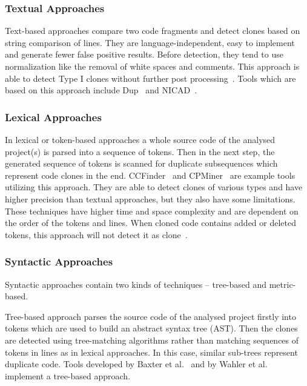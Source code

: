       \subsubsection*{Textual Approaches}\label{clone-detection:simian}
      Text-based approaches compare two code fragments and detect clones based on string comparison of lines.
      They are language-independent, easy to implement and generate fewer false positive results. Before detection,
      they tend to use normalization like the removal of white spaces and comments. This approach is able to detect
      Type I clones without further post processing~\cite{CloneDetectionTechniques, CodeClonesSurvey}. Tools which
      are based on this approach include Dup~\cite{Dup} and NICAD~\cite{NICAD}.

      \subsubsection*{Lexical Approaches}
      In lexical or token-based approaches a whole source code of the analysed project(s) is parsed into a sequence
      of tokens. Then in the next step, the generated sequence of tokens is scanned for duplicate subsequences which
      represent code clones in the end. CCFinder~\cite{CCFinder} and CPMiner~\cite{CPMiner} are example tools
      utilizing this approach. They are able to detect clones of various types and have higher precision than
      textual approaches, but they also have some limitations. These techniques have higher time and space
      complexity and are dependent on the order of the tokens and lines. When cloned code contains added or deleted
      tokens, this approach will not detect it as clone~\cite{CloneDetectionTechniques, CodeClonesSurvey}.

      \subsubsection*{Syntactic Approaches}
      Syntactic approaches contain two kinds of techniques -- tree-based and metric-based.

      Tree-based approach parses the source code of the analysed project firstly into tokens which are used
      to build an abstract syntax tree (AST). Then the clones are detected using tree-matching algorithms rather
      than matching sequences of tokens in lines as in lexical approaches. In this case, similar sub-trees
      represent duplicate code. Tools developed by Baxter et al.~\cite{ASTBaxter} and by Wahler et
      al.~\cite{ASTWahler} implement a tree-based approach.

